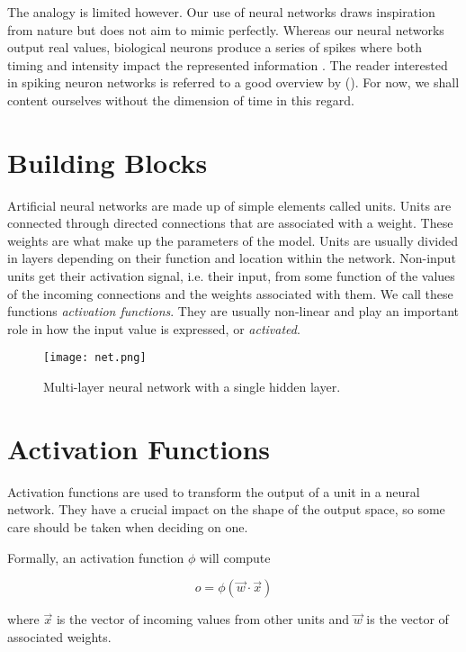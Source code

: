 The analogy is limited however.
Our use of neural networks draws inspiration from nature
but does not aim to mimic perfectly.
Whereas our neural networks output real values,
biological neurons produce a series of spikes
where both timing and intensity impact the represented information
\parencite{bialek1991reading}.
The reader interested in spiking neuron networks
is referred to a good overview by
\citeauthor{paugam2012computing} (\citeyear{paugam2012computing}).
For now,
we shall content ourselves without the dimension of time in this regard.

\section{Building Blocks}
Artificial neural networks are made up of simple elements called units.
Units are connected through directed connections
that are associated with a weight.
These weights are what make up the parameters of the model.
Units are usually divided in layers depending on their function
and location within the network.
Non-input units get their activation signal, i.e. their input,
from some function of the values of the incoming connections
and the weights associated with them.
We call these functions \textit{activation functions}.
They are usually non-linear and play an important role
in how the input value is expressed, or \textit{activated}.

\begin{figure}[h]
\label{fig.neuralnet}
\center
\texttt{[image: net.png]}
\caption[Multi-layer neural network]{
  Multi-layer neural network with a single hidden layer.
}
\end{figure}

\section{Activation Functions}
\label{sec:activation}

Activation functions are used to transform the output
of a unit in a neural network.
They have a crucial impact on the shape of the output space,
so some care should be taken when deciding on one.

Formally, an activation function $\phi$ will compute

\begin{equation}
  o = \phi (\overrightarrow{w} \cdot \overrightarrow{x})
\end{equation}

where $\overrightarrow{x}$
is the vector of incoming values from other units
and $\overrightarrow{w}$
is the vector of associated weights.

